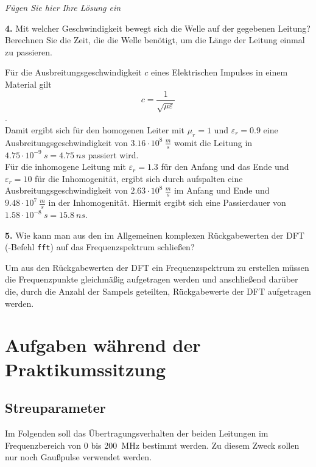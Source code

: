 \documentclass[Protokollheft.tex]{subfiles}
\begin{document}
\emph{Fügen Sie hier Ihre Lösung ein}

\begin{framed}
	\noindent \textbf{4.} Mit welcher Geschwindigkeit bewegt sich die Welle auf der gegebenen Leitung? Berechnen Sie die Zeit, die die Welle benötigt, um die Länge der Leitung einmal zu passieren.\label{exer:calcSpeedTime}
\end{framed}
\noindent
Für die Ausbreitungsgeschwindigkeit $c$ eines Elektrischen Impulses in einem Material gilt 
\begin{equation}
 \label{eq:cSpeed}
 c = \frac{1}{\sqrt{\mu \varepsilon}}
\end{equation}.\\
Damit ergibt sich für den homogenen Leiter mit $\mu_r = 1$ und $\varepsilon_r = 0.9$ eine Ausbreitungsgeschwindigkeit von $3.16 \cdot 10^8 \ \si{ \frac{m}{s}}$ womit die Leitung in $4.75\cdot 10^{-9} \  \si{ s} = 4.75 \  \si{ ns}$ passiert wird. \\
Für die inhomogene Leitung mit $\varepsilon_r = 1.3$ für den Anfang und das Ende und $\varepsilon_r = 10$ für die Inhomogenität, ergibt sich durch aufspalten eine Ausbreitungsgeschwindigkeit von $2.63\cdot 10^8 \ \si{\frac{m}{s}}$ im Anfang und Ende und $ 9.48 \cdot 10^7 \ \si{\frac{m}{s}}$ in der Inhomogenität. Hiermit ergibt sich eine Passierdauer von $1.58\cdot 10^{-8} \ \si{s} = 15.8 \ \si{ns}$.

\begin{framed}
	\noindent \textbf{5.} Wie kann man aus den im Allgemeinen komplexen Rückgabewerten der DFT (\matlab-Befehl \verb"fft") auf das Frequenzspektrum schließen?\label{exer:freqSpectByDFT}
\end{framed}
\noindent
Um aus den Rückgabewerten der DFT ein Frequenzspektrum zu erstellen müssen die Frequenzpunkte gleichmäßig aufgetragen werden und anschließend darüber die, durch die Anzahl der Sampels geteilten, Rückgabewerte der DFT aufgetragen werden. 

\section{Aufgaben während der Praktikumssitzung}

{\subsection{Streuparameter}}

\noindent
Im Folgenden soll das Übertragungsverhalten der beiden Leitungen
im Frequenzbereich von $0$ bis \SI{200}{MHz} bestimmt werden. Zu diesem
Zweck sollen nur noch Gaußpulse verwendet werden.
\end{document}
